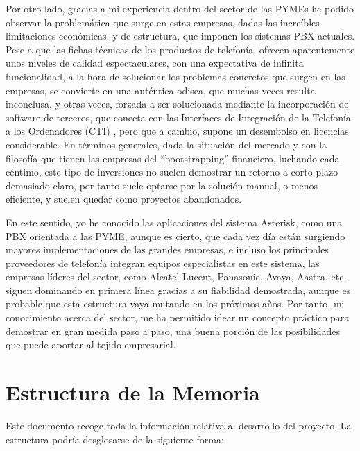 Por otro lado, gracias a mi experiencia dentro del sector de las PYMEs he podido observar la problemática que surge en estas empresas, dadas las increíbles limitaciones económicas, y de estructura, que imponen los sistemas PBX actuales. Pese a que las fichas técnicas de los productos de telefonía, ofrecen aparentemente unos niveles de calidad espectaculares, con una expectativa de infinita funcionalidad, a la hora de solucionar los problemas concretos que surgen en las empresas, se convierte en una auténtica odisea, que muchas veces resulta inconclusa, y otras veces, forzada a ser solucionada mediante la incorporación de software de terceros, que conecta con las Interfaces de Integración de la Telefonía a los Ordenadores (CTI) \cite{website:cti}, pero que a cambio, supone un desembolso en licencias considerable. En términos generales, dada la situación del mercado y con la filosofía que tienen las empresas del ``bootstrapping'' financiero, luchando cada céntimo, este tipo de inversiones no suelen demostrar un retorno a corto plazo demasiado claro, por tanto suele optarse por la solución manual, o menos eficiente, y suelen quedar como proyectos abandonados.

En este sentido, yo he conocido las aplicaciones del sistema Asterisk, como una PBX orientada a las PYME, aunque es cierto, que cada vez día están surgiendo mayores implementaciones de las grandes empresas, e incluso los principales proveedores de telefonía integran equipos especialistas en este sistema, las empresas líderes del sector, como Alcatel-Lucent, Panasonic, Avaya, Aastra, etc. siguen dominando en primera línea gracias a su fiabilidad demostrada, aunque es probable que esta estructura vaya mutando en los próximos años. Por tanto, mi conocimiento acerca del sector, me ha permitido idear un concepto práctico para demostrar en gran medida paso a paso, una buena porción de las posibilidades que puede aportar al tejido empresarial.

\section{Estructura de la Memoria}

Este documento recoge toda la información relativa al desarrollo del proyecto. La estructura podría desglosarse de la siguiente forma:

